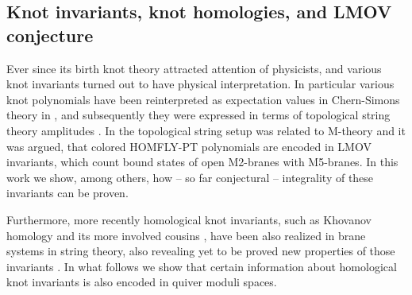 \documentclass[
 reprint,
 amsmath,amssymb,
 aps,prl
]{revtex4-1}
\begin{document}

\subsection{Knot invariants, knot homologies, and LMOV conjecture}

Ever since its birth knot theory attracted attention of physicists, and various knot invariants turned out to have physical interpretation. 
In particular various knot polynomials have been reinterpreted as expectation values in Chern-Simons theory in \cite{Witten_Jones}, and subsequently they were expressed in terms of topological string theory amplitudes \cite{Witten:1992fb}. In \cite{OoguriV} the topological string setup was related to M-theory and it was argued, that colored HOMFLY-PT polynomials are encoded in LMOV invariants, which count bound states of open M2-branes with M5-branes. In this work we show, among others, how -- so far conjectural -- integrality of these invariants can be proven. 

Furthermore, more recently homological knot invariants, such as Khovanov homology and its more involved cousins \cite{Khovanov,KhR1,KhR2}, have been also realized in brane systems in string theory, also revealing yet to be proved new properties of those invariants \cite{GSV,DGR,Gukov:2011ry}. In what follows we show that certain information about homological knot invariants is also encoded in quiver moduli spaces.
\end{document}
